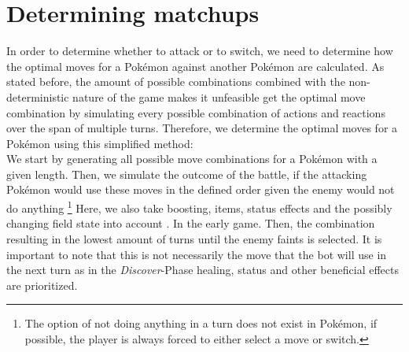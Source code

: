 \section{Determining matchups}
\label{sec:determine-matchups}
In order to determine whether to attack or to switch, we need to determine how the optimal moves for a Pokémon against
another Pokémon are calculated. As stated before, the amount of possible combinations combined with the non-deterministic
nature of the game makes it unfeasible get the optimal move combination by simulating every possible combination of 
actions and reactions over the span of multiple turns. Therefore, we determine the optimal moves for a Pokémon using 
this simplified method: \\
We start by generating all possible move combinations for a Pokémon with a given length. Then, we simulate the outcome
of the battle, if the attacking Pokémon would use these moves in the defined order given the enemy would not do anything
\footnote{The option of not doing anything in a turn does not exist in Pokémon, if possible, the player is always 
forced to either select a move or switch.} Here, we also take boosting, items, status effects and the possibly changing
field state into account .
In the early game. Then, the combination resulting in the lowest amount of turns until the enemy faints is selected. 
It is important to note that this is not necessarily the move that the bot will use in the next turn as in the 
\textit{Discover}-Phase healing, status and other beneficial effects are prioritized.